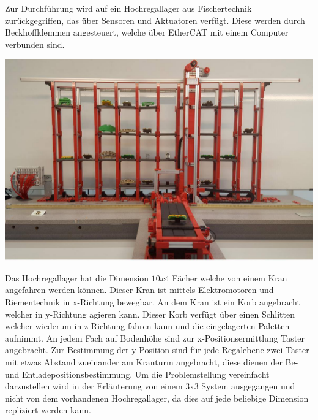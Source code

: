 \documentclass{fh-ium-bama}
\begin{document}
Zur Durchführung wird auf ein Hochregallager aus Fischertechnik zurückgegriffen, das über Sensoren und Aktuatoren verfügt. Diese werden durch Beckhoffklemmen angesteuert, welche über EtherCAT mit einem Computer verbunden sind.
\begin{center}
\includegraphics[scale=0.27]{Regal.pdf}
\end{center}
Das Hochregallager hat die Dimension $10x4$ Fächer welche von einem Kran angefahren werden können. Dieser Kran ist mittels Elektromotoren und Riementechnik in x-Richtung bewegbar. An dem Kran ist ein Korb angebracht welcher in y-Richtung agieren kann. Dieser Korb verfügt über einen Schlitten welcher wiederum in z-Richtung fahren kann und die eingelagerten Paletten aufnimmt. An jedem Fach auf Bodenhöhe sind zur x-Positionsermittlung Taster angebracht. Zur Bestimmung der y-Position sind für jede Regalebene zwei Taster mit etwas Abstand zueinander am Kranturm angebracht, diese dienen der Be- und Entladepositionsbestimmung.
Um die Problemstellung vereinfacht darzustellen wird in der Erläuterung von einem 3x3 System ausgegangen und nicht von dem vorhandenen Hochregallager, da dies auf jede beliebige Dimension repliziert werden kann.
\end{document}
